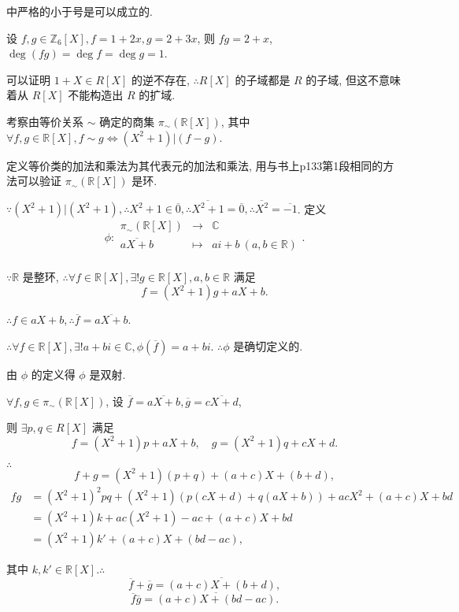 \documentclass[UTF8]{ctexart}
\begin{document}
中严格的小于号是可以成立的.
\begin{example}
    设 $f,g\in\mathbb{Z}_6[X],f=1+2x,g=2+3x$, 则 $fg=2+x$, $\deg(fg)=\deg f=\deg g=1$.

    可以证明 $1+X\in R[X]$ 的逆不存在, $\therefore R[X]$ 的子域都是 $R$ 的子域, 但这不意味着从 $R[X]$ 不能构造出 $R$ 的扩域.
\end{example}
\begin{example}
    考察由等价关系 $\sim$ 确定的商集 $\pi_\sim(\mathbb{R}[X])$, 其中 $\forall f,g\in\mathbb{R}[X],f\sim g\Leftrightarrow(X^2+1)|(f-g)$.

    定义等价类的加法和乘法为其代表元的加法和乘法, 用与书上p133第1段相同的方法可以验证 $\pi_\sim(\mathbb{R}[X])$ 是环.

    $\because(X^2+1)|(X^2+1),\therefore X^2+1\in\overline{0},\therefore\overline{X^2+1}=\overline{0},\therefore\overline{X^2}=\overline{-1}$. 定义
    \[\phi:\begin{array}{rcl}
        \pi_\sim(\mathbb{R}[X]) & \to & \mathbb{C} \\[6pt]
        \overline{aX+b} & \mapsto & ai+b\ (a,b\in\mathbb{R}) \\
    \end{array}.\]

    $\because\mathbb{R}$ 是整环, $\therefore\forall f\in\mathbb{R}[X],\exists!g\in\mathbb{R}[X],a,b\in\mathbb{R}$ 满足
    \[f=(X^2+1)g+aX+b.\]

    $\therefore f\in aX+b,\therefore\overline{f}=\overline{aX+b}$.

    $\therefore\forall f\in\mathbb{R}[X],\exists! a+bi\in\mathbb{C},\phi(\overline{f})=a+bi$. $\therefore\phi$ 是确切定义的.

    由 $\phi$ 的定义得 $\phi$ 是双射.

    $\forall f,g\in\pi_\sim(\mathbb{R}[X])$, 设 $\overline{f}=\overline{aX+b},\overline{g}=\overline{cX+d}$,

    则 $\exists p,q\in R[X]$ 满足
    \[f=(X^2+1)p+aX+b,\quad g=(X^2+1)q+cX+d.\]

    $\therefore$
    \[f+g=(X^2+1)(p+q)+(a+c)X+(b+d),\]
    \begin{align*}
        fg & =(X^2+1)^2pq+(X^2+1)(p(cX+d)+q(aX+b))+acX^2+(a+c)X+bd \\
        & =(X^2+1)k+ac(X^2+1)-ac+(a+c)X+bd \\
        & =(X^2+1)k'+(a+c)X+(bd-ac),
    \end{align*}

    其中 $k,k'\in\mathbb{R}[X].\therefore$
    \[\overline{f}+\overline{g}=\overline{(a+c)X+(b+d)},\]
    \[\overline{f}\overline{g}=\overline{(a+c)X+(bd-ac)}.\]


\end{example}
\end{document}
